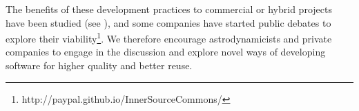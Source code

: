 The benefits of these development practices to commercial or hybrid projects have been studied (see \cite{Mockus_2002}), and some companies have started public debates to explore their viability\footnote{http://paypal.github.io/InnerSourceCommons/}. We therefore encourage astrodynamicists and private companies to engage in the discussion and explore novel ways of developing software for higher quality and better reuse.